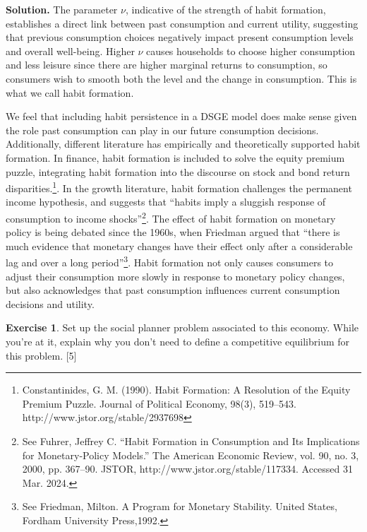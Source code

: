 \documentclass[11pt]{article}
\numberwithin{equation}{section} %
\numberwithin{figure}{section} %
\numberwithin{table}{section} %
\theoremstyle{definition}
\newtheorem{exercise}[theorem]{Exercise}
\newenvironment{solution}{\begin{addmargin}[2em]{0em} {\bf Solution. }}{\end{addmargin}}
\begin{document}
\begin{solution}
   The parameter $\nu$, indicative of the strength of habit formation, establishes a direct link between past consumption and current utility, suggesting that previous consumption choices negatively impact present consumption levels and overall well-being. Higher $\nu$ causes households to choose higher consumption and less leisure since there are higher marginal returns to consumption, so consumers wish to smooth both the level and the change in consumption. This is what we call habit formation.  

   We feel that including habit persistence in a DSGE model does make sense given the role past consumption can play in our future consumption decisions.  Additionally, different literature has empirically and theoretically supported habit formation. In finance, habit formation is included to solve the equity premium puzzle, integrating habit formation into the discourse on stock and bond return disparities.\footnote{Constantinides, G. M. (1990). Habit Formation: A Resolution of the Equity Premium Puzzle. Journal of Political Economy, 98(3), 519–543. http://www.jstor.org/stable/2937698}. In the growth literature, habit formation challenges the permanent income hypothesis, and suggests that ``habits imply a sluggish response of consumption to income shocks''\footnote{See Fuhrer, Jeffrey C. ``Habit Formation in Consumption and Its Implications for Monetary-Policy Models.'' The American Economic Review, vol. 90, no. 3, 2000, pp. 367–90. JSTOR, http://www.jstor.org/stable/117334. Accessed 31 Mar. 2024.}. The effect of habit formation on monetary policy is being debated since the 1960s, when Friedman argued that ``there is much evidence that monetary changes have their effect only after a considerable lag and over a long period''\footnote{See Friedman, Milton. A Program for Monetary Stability. United States, Fordham University Press,1992.}. Habit formation not only causes consumers to adjust their consumption more slowly in response to monetary policy changes, but also acknowledges that past consumption influences current consumption decisions and utility. 
\end{solution}


\begin{exercise}
    Set up the social planner problem associated to this economy. While you're at it, explain why you don't need to define a competitive equilibrium for this problem. [5]
\end{exercise}
\end{document}
